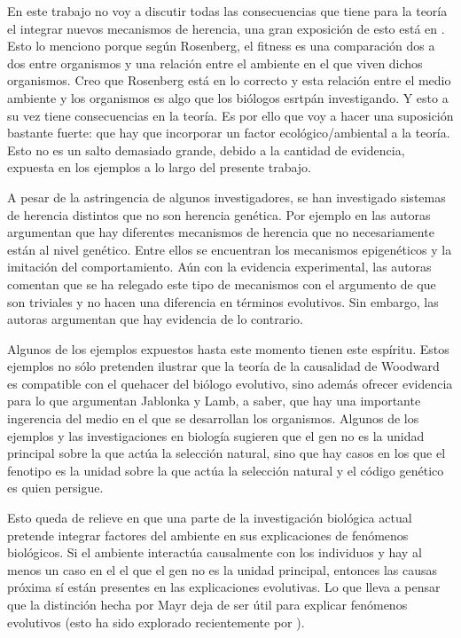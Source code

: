 En este trabajo no voy a discutir todas las consecuencias que tiene para la teoría el integrar nuevos mecanismos de herencia, una gran exposición de esto está en \cite{Jablonka2020}. Esto lo menciono porque según Rosenberg, el fitness es una comparación dos a dos entre organismos y una relación entre el ambiente en el que viven dichos organismos. Creo que Rosenberg está en lo correcto y esta relación entre el medio ambiente y los organismos es algo que los biólogos esrtpán investigando. Y esto a su vez tiene consecuencias en la teoría. Es por ello que voy a hacer una suposición bastante fuerte: que hay que incorporar un factor ecológico/ambiental a la teoría. Esto no es un salto demasiado grande, debido a la cantidad de evidencia, expuesta en los ejemplos a lo largo del presente trabajo.

A pesar de la astringencia de algunos investigadores, se han investigado sistemas de herencia distintos que no son herencia genética. Por ejemplo en \cite{Jablonka2020} las autoras argumentan que hay diferentes mecanismos de herencia que no necesariamente están al nivel genético. Entre ellos se encuentran los mecanismos epigenéticos y la imitación del comportamiento. Aún con la evidencia experimental, las autoras comentan que se ha relegado este tipo de mecanismos con el argumento de que son triviales y no hacen una diferencia en términos evolutivos. Sin embargo, las autoras argumentan que hay evidencia de lo contrario.

Algunos de los ejemplos expuestos hasta este momento tienen este espíritu. Estos ejemplos no sólo pretenden ilustrar que la teoría de la causalidad de Woodward es compatible con el quehacer del biólogo evolutivo, sino además ofrecer evidencia para lo que argumentan Jablonka y Lamb, a saber, que hay una importante ingerencia del medio en el que se desarrollan los organismos. Algunos de los ejemplos y las investigaciones en biología sugieren que el gen no es la unidad principal sobre la que actúa la selección natural, sino que hay casos en los que el fenotipo es la unidad sobre la que actúa la selección natural y el código genético es quien persigue.

Esto queda de relieve en que una parte de la investigación biológica actual pretende integrar factores del ambiente en sus explicaciones de fenómenos biológicos. Si el ambiente interactúa causalmente con los individuos y hay al menos un caso en el el que el gen no es la unidad principal, entonces las causas próxima sí están presentes en las explicaciones evolutivas. Lo que lleva a pensar que la distinción hecha por Mayr deja de ser útil para explicar fenómenos evolutivos (esto ha sido explorado recientemente por \cite{Uller2020, Dayan2020, Laland2011}).

